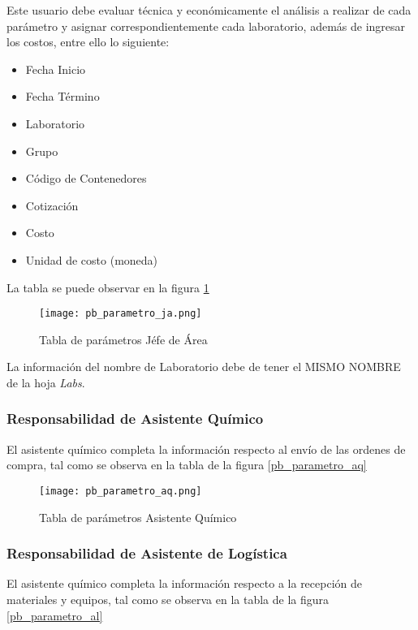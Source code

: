 Este usuario debe evaluar técnica y económicamente el análisis a realizar de cada parámetro y asignar correspondientemente cada laboratorio, además de ingresar los costos, entre ello lo siguiente:

\begin{itemize}
	\item Fecha Inicio
	\item Fecha Término
	\item Laboratorio
	\item Grupo
	\item Código de Contenedores
	\item Cotización
	\item Costo
	\item Unidad de costo (moneda)
\end{itemize}

La tabla se puede observar en la figura \ref{pb_parametro_ja}

\begin{figure}
	\centering
	\texttt{[image: pb\_parametro\_ja.png]}
	\caption{Tabla de parámetros Jéfe de Área}
	\label{pb_parametro_ja}
\end{figure}

La información del nombre de Laboratorio debe de tener el \MakeUppercase{mismo nombre} de la hoja \textit{Labs}.

\subsubsection{Responsabilidad de Asistente Químico}

El asistente químico completa la información respecto al envío de las ordenes de compra, tal como se observa en la tabla de la figura \ref{pb_parametro_aq}

\begin{figure}
	\centering
	\texttt{[image: pb\_parametro\_aq.png]}
	\caption{Tabla de parámetros Asistente Químico}
	\label{pb_parametro_jq}
\end{figure}

\subsubsection{Responsabilidad de Asistente de Logística}

El asistente químico completa la información respecto a la recepción de materiales y equipos, tal como se observa en la tabla de la figura \ref{pb_parametro_al}

